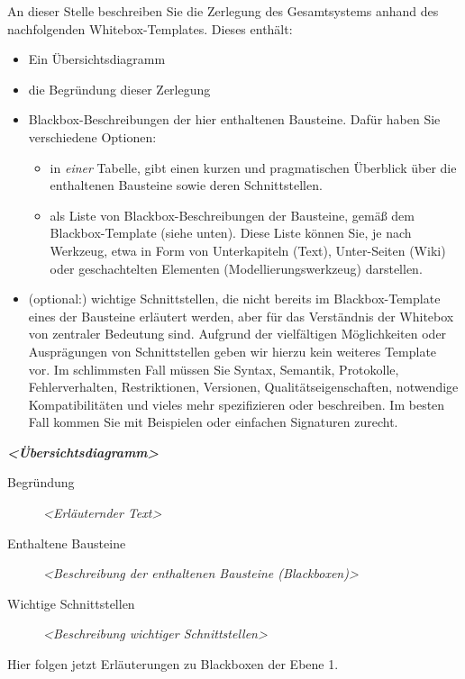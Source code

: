 \documentclass[]{article}
\begin{document}
An dieser Stelle beschreiben Sie die Zerlegung des Gesamtsystems anhand
des nachfolgenden Whitebox-Templates. Dieses enthält:

\begin{itemize}
\item
  Ein Übersichtsdiagramm
\item
  die Begründung dieser Zerlegung
\item
  Blackbox-Beschreibungen der hier enthaltenen Bausteine. Dafür haben
  Sie verschiedene Optionen:

  \begin{itemize}
  \item
    in \emph{einer} Tabelle, gibt einen kurzen und pragmatischen
    Überblick über die enthaltenen Bausteine sowie deren Schnittstellen.
  \item
    als Liste von Blackbox-Beschreibungen der Bausteine, gemäß dem
    Blackbox-Template (siehe unten). Diese Liste können Sie, je nach
    Werkzeug, etwa in Form von Unterkapiteln (Text), Unter-Seiten (Wiki)
    oder geschachtelten Elementen (Modellierungswerkzeug) darstellen.
  \end{itemize}
\item
  (optional:) wichtige Schnittstellen, die nicht bereits im
  Blackbox-Template eines der Bausteine erläutert werden, aber für das
  Verständnis der Whitebox von zentraler Bedeutung sind. Aufgrund der
  vielfältigen Möglichkeiten oder Ausprägungen von Schnittstellen geben
  wir hierzu kein weiteres Template vor. Im schlimmsten Fall müssen Sie
  Syntax, Semantik, Protokolle, Fehlerverhalten, Restriktionen,
  Versionen, Qualitätseigenschaften, notwendige Kompatibilitäten und
  vieles mehr spezifizieren oder beschreiben. Im besten Fall kommen Sie
  mit Beispielen oder einfachen Signaturen zurecht.
\end{itemize}

\emph{\textbf{\textless{}Übersichtsdiagramm\textgreater{}}}

\begin{description}
\item[Begründung]
\emph{\textless{}Erläuternder Text\textgreater{}}
\item[Enthaltene Bausteine]
\emph{\textless{}Beschreibung der enthaltenen Bausteine
(Blackboxen)\textgreater{}}
\item[Wichtige Schnittstellen]
\emph{\textless{}Beschreibung wichtiger Schnittstellen\textgreater{}}
\end{description}

Hier folgen jetzt Erläuterungen zu Blackboxen der Ebene 1.
\end{document}
